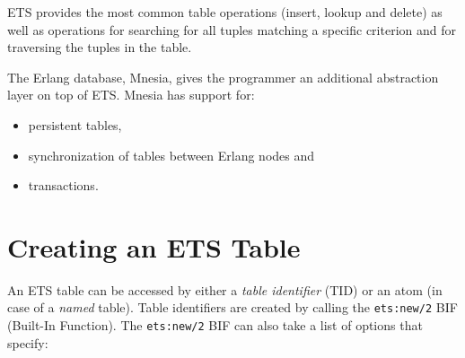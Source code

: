 \documentclass[aps,pre,preprint,nofootinbib]{revtex4}
\begin{document}
ETS provides the most common table operations (insert, lookup and delete) as well as operations for searching for all tuples matching a specific criterion and for traversing the tuples in the table.

The Erlang database, Mnesia, gives the programmer an additional abstraction layer on top of ETS. 
Mnesia has support for:
\begin{itemize}
\item persistent tables,
\item synchronization of tables between Erlang nodes and
\item transactions.
\end{itemize}

\section{Creating an ETS Table}

An ETS table can be accessed by either a \emph{table identifier} (TID) or an atom (in case of a \emph{named} table).
Table identifiers are created by calling the \verb|ets:new/2| BIF (Built-In Function).
The \verb|ets:new/2| BIF can also take a list of options that specify:
\end{document}
